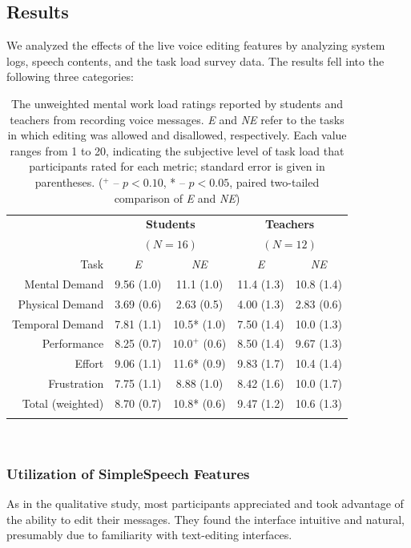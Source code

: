 \subsection{Results}
We analyzed the effects of the live voice editing features by analyzing system logs, speech contents, and the task load survey data. The results fell into the following three categories:

\begin{table}
	\centering
	\begin{tabular}{r c c c c}
		& \multicolumn{2}{c}{\textbf{Students}} & \multicolumn{2}{c}{\textbf{Teachers}}\\
		& \multicolumn{2}{c}{$(N=16)$} & \multicolumn{2}{c}{$(N=12)$}\\
		\toprule
		Task			& \textit{E} & \textit{NE} & \textit{E} & \textit{NE}\\
		Mental Demand   & 9.56 (1.0) & 11.1 (1.0) & 11.4 (1.3) & 10.8 (1.4) \\
		Physical Demand & 3.69 (0.6) & 2.63 (0.5) & 4.00 (1.3) & 2.83 (0.6) \\
		Temporal Demand & 7.81 (1.1) & 10.5* (1.0) & 7.50 (1.4) & 10.0 (1.3) \\
		Performance     & 8.25 (0.7) & $10.0^+$ (0.6) & 8.50 (1.4) & 9.67 (1.3) \\
		Effort          & 9.06 (1.1) & 11.6* (0.9) & 9.83 (1.7) & 10.4 (1.4) \\
		Frustration     & 7.75 (1.1) & 8.88 (1.0) & 8.42 (1.6) & 10.0 (1.7) \\
		\midrule
		Total (weighted)& 8.70 (0.7) & 10.8* (0.6) & 9.47 (1.2) & 10.6 (1.3) \\
		\bottomrule \\
	\end{tabular}
	\caption{The unweighted mental work load ratings reported by students and teachers from recording voice messages. \textit{E} and \textit{NE} refer to the tasks in which editing was allowed and disallowed, respectively. Each value ranges from 1 to 20, indicating the subjective level of task load that participants rated for each metric; standard error is given in parentheses. ($^+$ -- $p<0.10$, * -- $p<0.05$, paired two-tailed comparison of \textit{E} and \textit{NE})}~\label{tab:table1}
\end{table}

\subsubsection{Utilization of SimpleSpeech Features}
As in the qualitative study, most participants appreciated and took advantage of the ability to edit their messages. They found the interface intuitive and natural, presumably due to familiarity with text-editing interfaces. 

